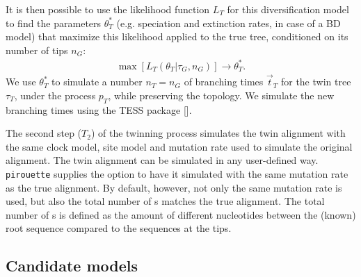 

It is then possible to use the likelihood function 
$L_{\mathit{T}}$ for this diversification model to find 
the parameters $\theta^{*}_{\mathit{T}}$ 
(e.g. speciation and extinction rates, in case of a BD model) 
that maximize this likelihood applied 
to the true tree, conditioned on its number of tips $n_{\mathit{G}}$:
\begin{align}
    \max[L_{\mathit{T}}(\theta_{\mathit{T}}|\tau_{\mathit{G}}, n_{\mathit{G}})] 
\rightarrow \theta^{*}_{\mathit{T}}.
\end{align}
We use $\theta^{*}_{\mathit{T}}$ to simulate a number 
$n_{\mathit{T}} = n_{\mathit{G}}$ 
of branching times $\Vec{t}_{\mathit{T}}$ for the twin tree 
$\tau_{\mathit{T}}$, under the process $p_{T}$, 
while preserving the topology. 
We simulate the new branching times using the TESS 
package [\cite{TESS, hohna2016tess}].

The second step ($T_2$) of the twinning process simulates the twin alignment 
with the same clock model, site model and mutation rate 
used to simulate the original alignment. 
The twin alignment can be simulated in any user-defined way.
\verb;pirouette; supplies the option to have it simulated with
the same mutation rate as the true alignment. By default, however,
not only the same mutation rate is used, but also the total number of s
matches the true alignment. The total number of s is defined
as the amount of different nucleotides between the (known) root sequence
compared to the sequences at the tips.

\subsection{Candidate models}\label{subsec:candidates}

